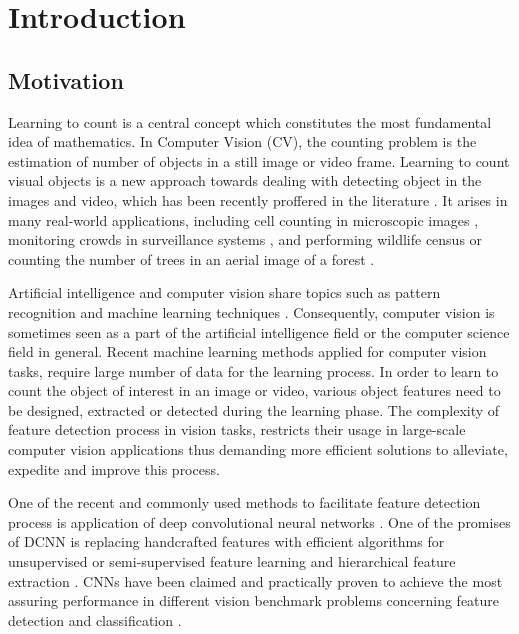 \chapter{Introduction}
\label{sec:introduction}
\section{Motivation}
Learning to count is a central concept which constitutes the most fundamental idea of mathematics. In Computer Vision (CV), the counting problem is the estimation of number of objects in a still image or video frame. Learning to count visual objects is a new approach towards dealing with detecting object in the images and video, which has been recently proffered in the literature \cite{rabaud2006counting, kong2005counting, chan2008privacy, segui2015learning}. It arises in many real-world applications, including cell counting in microscopic images \cite{flaccavento2011learning}, monitoring crowds in surveillance systems \cite{rahmalan2006crowd}, and performing wildlife census or counting the number of trees in an aerial image of a forest \cite{pollock1996automatic,NIPS2010_4043}. 

Artificial intelligence and computer vision share topics such as pattern recognition and machine learning techniques \cite{mitchell1997machine}. Consequently, computer vision is sometimes seen as a part of the artificial intelligence field or the computer science field in general. Recent machine learning methods applied for computer vision tasks, require large number of data for the learning process. In order to learn to count the object of interest in an image or video, various object features need to be designed, extracted or detected during the learning phase. The complexity of feature detection process in vision tasks, restricts their usage in large-scale computer vision applications thus demanding more efficient solutions to alleviate, expedite and improve this process. 

\indent One of the recent and commonly used methods to facilitate feature detection process is application of deep convolutional neural networks \cite{szegedy2015going, krizhevsky2012imagenet, lecun1995convolutional}. One of the promises of DCNN is replacing handcrafted features with efficient algorithms for unsupervised or semi-supervised feature learning and hierarchical feature extraction \cite{song2013hierarchical}. CNNs have been claimed and practically proven to achieve the most assuring performance in different vision benchmark problems concerning feature detection and classification \cite{ciresan2011flexible, szegedy2015going, ciresan2012multi}. 

